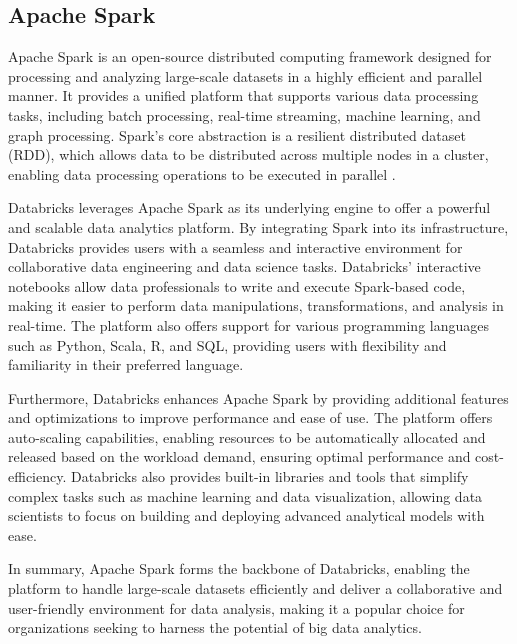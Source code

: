 \subsection{Apache Spark}

Apache Spark is an open-source distributed computing framework designed for processing and analyzing large-scale datasets in a highly efficient and parallel manner.
It provides a unified platform that supports various data processing tasks, including batch processing, real-time streaming, machine learning, and graph processing.
Spark's core abstraction is a resilient distributed dataset (RDD), which allows data to be distributed across multiple nodes in a cluster, enabling data processing operations to be executed in parallel \autocite{apacheSpark}.

Databricks leverages Apache Spark as its underlying engine to offer a powerful and scalable data analytics platform.
By integrating Spark into its infrastructure, Databricks provides users with a seamless and interactive environment for collaborative data engineering and data science tasks.
Databricks' interactive notebooks allow data professionals to write and execute Spark-based code, making it easier to perform data manipulations, transformations, and analysis in real-time.
The platform also offers support for various programming languages such as Python, Scala, R, and SQL, providing users with flexibility and familiarity in their preferred language.

Furthermore, Databricks enhances Apache Spark by providing additional features and optimizations to improve performance and ease of use.
The platform offers auto-scaling capabilities, enabling resources to be automatically allocated and released based on the workload demand, ensuring optimal performance and cost-efficiency.
Databricks also provides built-in libraries and tools that simplify complex tasks such as machine learning and data visualization, allowing data scientists to focus on building and deploying advanced analytical models with ease.

In summary, Apache Spark forms the backbone of Databricks, enabling the platform to handle large-scale datasets efficiently and deliver a collaborative and user-friendly environment for data analysis, making it a popular choice for organizations seeking to harness the potential of big data analytics.

